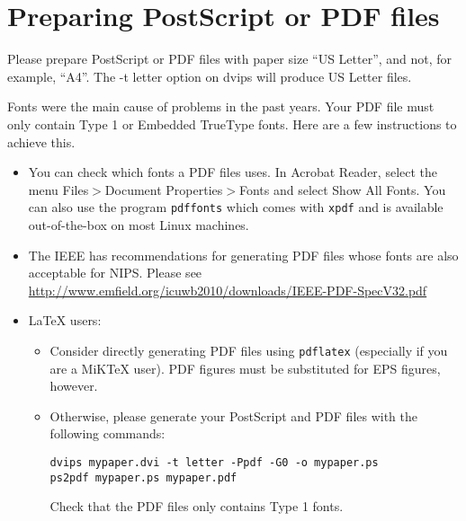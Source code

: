 \documentclass{article} %
\begin{document}
\section{Preparing PostScript or PDF files}

Please prepare PostScript or PDF files with paper size ``US Letter'', and
not, for example, ``A4''. The -t
letter option on dvips will produce US Letter files.

Fonts were the main cause of problems in the past years. Your PDF file must
only contain Type 1 or Embedded TrueType fonts. Here are a few instructions
to achieve this.

\begin{itemize}

   \item You can check which fonts a PDF files uses.  In Acrobat Reader,
         select the menu Files$>$Document Properties$>$Fonts and select Show All Fonts. You can
         also use the program \verb+pdffonts+ which comes with \verb+xpdf+ and is
         available out-of-the-box on most Linux machines.

   \item The IEEE has recommendations for generating PDF files whose fonts
         are also acceptable for NIPS. Please see
         \url{http://www.emfield.org/icuwb2010/downloads/IEEE-PDF-SpecV32.pdf}

   \item LaTeX users:

         \begin{itemize}

            \item Consider directly generating PDF files using \verb+pdflatex+
                  (especially if you are a MiKTeX user).
                  PDF figures must be substituted for EPS figures, however.

            \item Otherwise, please generate your PostScript and PDF files with the following commands:
                  \begin{verbatim} 
dvips mypaper.dvi -t letter -Ppdf -G0 -o mypaper.ps
ps2pdf mypaper.ps mypaper.pdf
\end{verbatim}

                  Check that the PDF files only contains Type 1 fonts.


\end{itemize}
\end{itemize}
\end{document}
